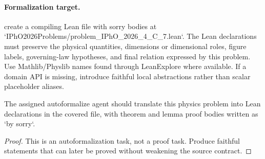 \paragraph{Formalization target.}
create a compiling Lean file with sorry bodies at `IPhO2026Problems/problem\_IPhO\_2026\_4\_C\_7.lean`.
The Lean declarations must preserve the physical quantities, dimensions or dimensional roles, figure labels, governing-law hypotheses, and final relation expressed by this problem.
Use Mathlib/Physlib names found through LeanExplore where available. If a domain API is missing, introduce faithful local abstractions rather than scalar placeholder aliases.

\begin{theorem}
\label{thm:physics:IPhO_2026_4_C_7:target}
The assigned autoformalize agent should translate this physics problem into Lean declarations in the covered file, with theorem and lemma proof bodies written as `by sorry`.
\end{theorem}
\begin{proof}
This is an autoformalization task, not a proof task. Produce faithful statements that can later be proved without weakening the source contract.
\end{proof}


